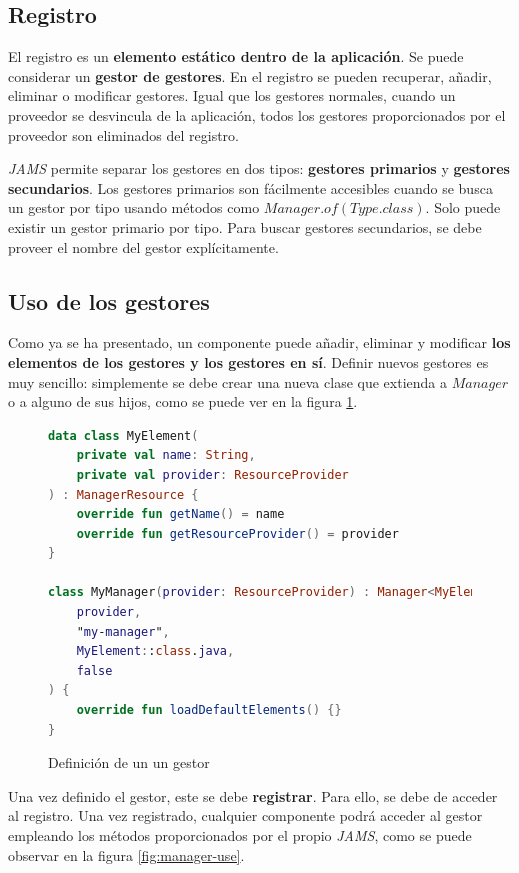 \subsection{Registro}\label{subsec:registro}

El registro es un \textbf{elemento estático dentro de la aplicación}.
Se puede considerar un \textbf{gestor de gestores}.
En el registro se pueden recuperar, añadir, eliminar o modificar gestores.
Igual que los gestores normales, cuando un proveedor se desvincula de la aplicación,
todos los gestores proporcionados por el proveedor son eliminados del registro.

 \textit{JAMS} permite separar los gestores en dos tipos:
\textbf{gestores primarios} y \textbf{gestores secundarios}.
Los gestores primarios son fácilmente accesibles cuando se busca un gestor por tipo
usando métodos como $Manager.of(Type.class)$.
Solo puede existir un gestor primario por tipo.
Para buscar gestores secundarios, se debe proveer el nombre del gestor explícitamente.

\subsection{Uso de los gestores}\label{subsec:uso-de-los-gestores}

Como ya se ha presentado, un componente puede añadir, eliminar
y modificar \textbf{los elementos de los gestores y los gestores en sí}.
Definir nuevos gestores es muy sencillo: simplemente se debe crear
una nueva clase que extienda a $Manager$ o a alguno de sus hijos,
como se puede ver en la figura \ref{fig:manager-definition}.

\begin{figure}[h]
    \centering
    \begin{lstlisting}[frame=single,label={lst:manager-definition},language=Kotlin]
data class MyElement(
    private val name: String,
    private val provider: ResourceProvider
) : ManagerResource {
    override fun getName() = name
    override fun getResourceProvider() = provider
}

class MyManager(provider: ResourceProvider) : Manager<MyElement>(
    provider,
    "my-manager",
    MyElement::class.java,
    false
) {
    override fun loadDefaultElements() {}
}
    \end{lstlisting}
    \caption{Definición de un un gestor}
    \label{fig:manager-definition}
\end{figure}

 Una vez definido el gestor, este se debe \textbf{registrar}.
Para ello, se debe de acceder al registro.
Una vez registrado, cualquier componente podrá acceder al
gestor empleando los métodos proporcionados por el propio \textit{JAMS},
como se puede observar en la figura \ref{fig:manager-use}.

